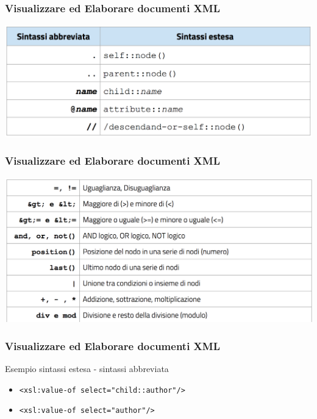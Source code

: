 \begin{frame}
    \frametitle{Visualizzare ed Elaborare documenti XML}
    \addtocounter{nframe}{1}
    
    \begin{center}
        \includegraphics[width=.9\textwidth]{imgs/Sintassi-Abbreviata-Estesa.png}
    \end{center}

\end{frame}


\begin{frame}
    \frametitle{Visualizzare ed Elaborare documenti XML}
    \addtocounter{nframe}{1}
    
    \begin{center}
        \includegraphics[width=.9\textwidth]{imgs/Tab-Operatori-Predicato.png}
    \end{center}

\end{frame}

\begin{frame}
    \frametitle{Visualizzare ed Elaborare documenti XML}
    \addtocounter{nframe}{1}
    

    \begin{block}{Esempio sintassi estesa - sintassi abbreviata}
        \begin{itemize}
            \item \texttt{<xsl:value-of select="child::author"/>}
            \item \texttt{<xsl:value-of select="author"/>}
        \end{itemize}
    \end{block}

\end{frame}

